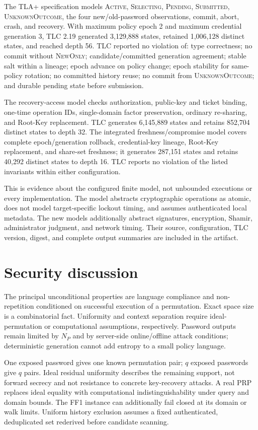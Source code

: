 \documentclass[preprint,12pt]{elsarticle}
\begin{document}
The TLA+ specification models \textsc{Active}, \textsc{Selecting},
\textsc{Pending}, \textsc{Submitted}, \textsc{UnknownOutcome}, the four
new/old-password observations, commit, abort, crash, and recovery. With maximum
policy epoch 2 and maximum credential generation 3, TLC 2.19 generated
3,129,888 states, retained 1,006,128 distinct states, and reached depth 56.
TLC reported no violation of: type correctness; no
commit without \textsc{NewOnly}; candidate/committed generation agreement;
stable salt within a lineage; epoch advance on policy change; epoch stability
for same-policy rotation; no committed history reuse; no commit from
\textsc{UnknownOutcome}; and durable pending state before submission.

The recovery-access model checks authorization, public-key and ticket binding,
one-time operation IDs, single-domain factor preservation, ordinary re-sharing,
and Root-Key replacement. TLC generates 6,145,889 states and retains 852,704
distinct states to depth 32. The integrated freshness/compromise model covers
complete epoch/generation rollback, credential-key lineage, Root-Key
replacement, and share-set freshness; it generates 287,151 states and retains
40,292 distinct states to depth 16. TLC reports no violation of the listed
invariants within either configuration.

This is evidence about the configured finite model, not unbounded executions
or every implementation. The model abstracts cryptographic operations as atomic,
does not model target-specific lockout timing, and assumes authenticated local
metadata. The new models additionally abstract signatures, encryption, Shamir,
administrator judgment, and network timing. Their source, configuration, TLC
version, digest, and complete output summaries are included in the artifact.

\section{Security discussion}

The principal unconditional properties are language compliance and
non-repetition conditioned on successful execution of a permutation. Exact
space size is a combinatorial fact. Uniformity and context separation require
ideal-permutation or computational assumptions, respectively. Password
outputs remain limited by $N_P$ and by server-side online/offline attack
conditions; deterministic generation cannot add entropy to a small policy
language.

One exposed password gives one known permutation pair; $q$ exposed passwords
give $q$ pairs. Ideal residual uniformity describes the remaining support, not
forward secrecy and not resistance to concrete key-recovery attacks. A real PRP
replaces ideal equality with computational indistinguishability under query and
domain bounds. The FF1 instance can additionally fail closed at its domain or
walk limits. Uniform history exclusion assumes a fixed authenticated,
deduplicated set rederived before candidate scanning.
\end{document}
